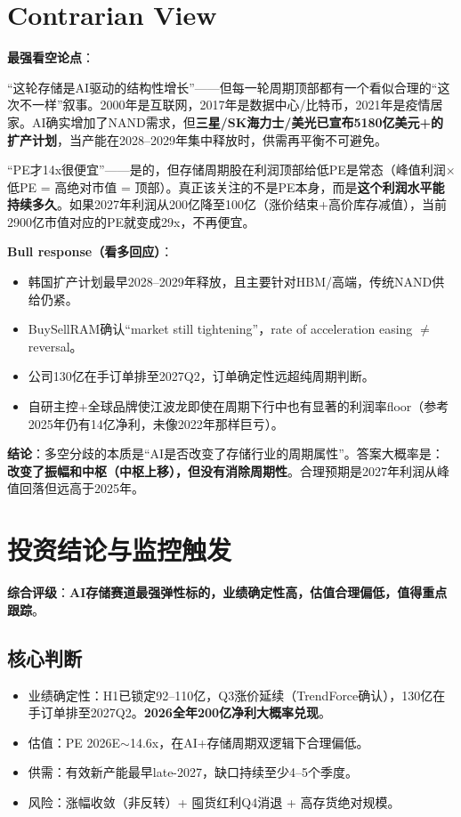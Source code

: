 \documentclass[a4paper,11pt,fontset=none]{ctexart}
\begin{document}
\section{Contrarian View}

\textbf{最强看空论点}：

``这轮存储是AI驱动的结构性增长''——但每一轮周期顶部都有一个看似合理的``这次不一样''叙事。2000年是互联网，2017年是数据中心/比特币，2021年是疫情居家。AI确实增加了NAND需求，但\textbf{三星/SK海力士/美光已宣布5180亿美元+的扩产计划}，当产能在2028--2029年集中释放时，供需再平衡不可避免。

``PE才14x很便宜''——是的，但存储周期股在利润顶部给低PE是常态（峰值利润×低PE = 高绝对市值 = 顶部）。真正该关注的不是PE本身，而是\textbf{这个利润水平能持续多久}。如果2027年利润从200亿降至100亿（涨价结束+高价库存减值），当前2900亿市值对应的PE就变成29x，不再便宜。

\textbf{Bull response（看多回应）}：
\begin{itemize}
  \item 韩国扩产计划最早2028--2029年释放，且主要针对HBM/高端，传统NAND供给仍紧。
  \item BuySellRAM确认``market still tightening''，rate of acceleration easing $\neq$ reversal。
  \item 公司130亿在手订单排至2027Q2，订单确定性远超纯周期判断。
  \item 自研主控+全球品牌使江波龙即使在周期下行中也有显著的利润率floor（参考2025年仍有14亿净利，未像2022年那样巨亏）。
\end{itemize}

\textbf{结论}：多空分歧的本质是``AI是否改变了存储行业的周期属性''。答案大概率是：\textbf{改变了振幅和中枢（中枢上移），但没有消除周期性}。合理预期是2027年利润从峰值回落但远高于2025年。

\section{投资结论与监控触发}

\textbf{综合评级}：\textbf{AI存储赛道最强弹性标的，业绩确定性高，估值合理偏低，值得重点跟踪}。

\subsection*{核心判断}
\begin{itemize}
  \item 业绩确定性：H1已锁定92--110亿，Q3涨价延续（TrendForce确认），130亿在手订单排至2027Q2。\textbf{2026全年200亿净利大概率兑现}。
  \item 估值：PE 2026E$\sim$14.6x，在AI+存储周期双逻辑下合理偏低。
  \item 供需：有效新产能最早late-2027，缺口持续至少4--5个季度。
  \item 风险：涨幅收敛（非反转）+ 囤货红利Q4消退 + 高存货绝对规模。
\end{itemize}
\end{document}
